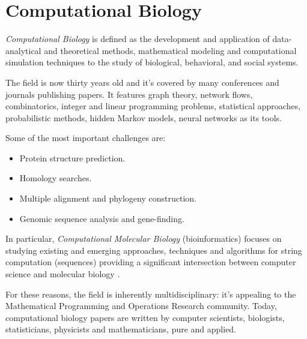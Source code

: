\section{Computational Biology} 
 
\textit{Computational Biology} is defined as the development and application of data-analytical and theoretical methods, mathematical modeling and computational simulation techniques to the study of biological, behavioral, and social systems\cite{1}.

The field is now thirty years old and it's covered by many conferences and journals publishing papers. It features graph theory, network flows, combinatorics, integer and linear programming problems, statistical approaches, probabilistic methods, hidden Markov models, neural networks as its tools.

Some of the most important challenges are\cite{Searls19983}:
\begin{itemize}
\item Protein structure prediction.
\item Homology searches.
\item Multiple alignment and phylogeny construction.
\item Genomic sequence analysis and gene-finding.
\end{itemize}

In particular, \textit{Computational Molecular Biology} (bioinformatics) focuses on studying existing and emerging approaches, techniques and algorithms for string computation (sequences) providing a significant intersection between computer science and molecular biology \cite{Gusfield:1997:AST:262228}.

For these reasons, the field is inherently multidisciplinary: it's appealing to the Mathematical Programming and Operations Research community. 
Today, computational biology papers are written by computer scientists, biologists, statisticians, physicists and mathematicians, pure and applied.

